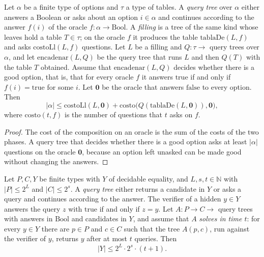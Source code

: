 \begin{theorem}
  \label{thm:barriers-trabajo-se-conserva}
  \leanok
  Let $\alpha$ be a finite type of options and $\tau$ a type of tables. A \emph{query tree} over
  $\alpha$ either answers a Boolean or asks about an option $i \in \alpha$ and continues according
  to the answer $f(i)$ of the oracle $f : \alpha \to \mathrm{Bool}$. A \emph{filling} is a tree of
  the same kind whose leaves hold a table $T \in \tau$; on the oracle $f$ it produces the table
  $\mathrm{tablaDe}(L, f)$ and asks $\mathrm{costoLl}(L, f)$ questions. Let $L$ be a filling and
  $Q : \tau \to$ query trees over $\alpha$, and let $\mathrm{encadenar}(L, Q)$ be the query tree
  that runs $L$ and then $Q(T)$ with the table $T$ obtained. Assume that $\mathrm{encadenar}(L, Q)$
  decides whether there is a good option, that is, that for every oracle $f$ it answers
  $\mathrm{true}$ if and only if $f(i) = \mathrm{true}$ for some $i$. Let $\mathbf{0}$ be the oracle
  that answers $\mathrm{false}$ to every option. Then
  \[
    |\alpha| \le \mathrm{costoLl}(L, \mathbf{0}) + \mathrm{costo}\bigl(Q(\mathrm{tablaDe}(L, \mathbf{0})), \mathbf{0}\bigr),
  \]
  where $\mathrm{costo}(t, f)$ is the number of questions that $t$ asks on $f$.
  \own{}
\end{theorem}

\begin{proof}
  \leanok
  The cost of the composition on an oracle is the sum of the costs of the two phases. A query tree
  that decides whether there is a good option asks at least $|\alpha|$ questions on the oracle
  $\mathbf{0}$, because an option left unasked can be made good without changing the answers.
\end{proof}

\begin{theorem}
  \label{thm:barriers-ley-si-no}
  \leanok
  Let $P, C, Y$ be finite types with $Y$ of decidable equality, and $L, s, t \in \mathbb{N}$ with
  $|P| \le 2^L$ and $|C| \le 2^s$. A \emph{query tree} either returns a candidate in $Y$ or asks a
  query and continues according to the answer. The verifier of a hidden $y \in Y$ answers the query
  $z$ with $\mathrm{true}$ if and only if $z = y$. Let $A : P \to C \to$ query trees with answers in
  $\mathrm{Bool}$ and candidates in $Y$, and assume that $A$ \emph{solves in time $t$}: for every
  $y \in Y$ there are $p \in P$ and $c \in C$ such that the tree $A(p, c)$, run against the
  verifier of $y$, returns $y$ after at most $t$ queries. Then
  \[
    |Y| \le 2^L \cdot 2^s \cdot (t + 1) .
  \]
  \own{}
\end{theorem}

